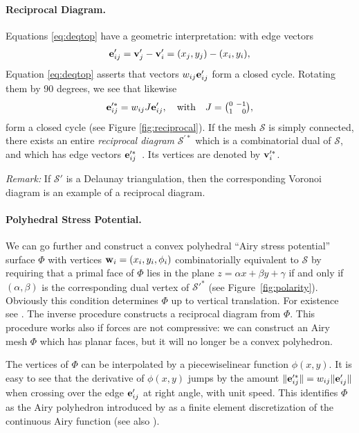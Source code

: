 \documentclass[annual]{acmsiggraph}
\def\SS{{\mathcal S}}
\begin{document}
\paragraph{Reciprocal Diagram.}

Equations \eqref{eq:deqtop} have a geometric interpretation: with edge
vectors
	\begin{align*}
	{\mathbf e}'_{ij} = {\mathbf v}_j'-{\mathbf v}_i'=(x_j, y_j) - (x_i, y_i),
	\end{align*}
 Equation \eqref{eq:deqtop} asserts that vectors $w_{ij} {\mathbf e}_{ij}'$ form a
closed cycle. Rotating them by 90 degrees, we see that likewise
	\begin{align*}
	{\mathbf e}_{ij}^{\prime *} = w_{ij} J {\mathbf e}_{ij}', \quad \text{with}\quad
	J={\textstyle{0 \ -1 \choose 1 \ \hphantom{-}0}},
	\end{align*}
 form a closed cycle (see Figure \ref{fig:reciprocal}). If the mesh $\SS$
is simply connected, there exists an entire {\em reciprocal diagram}
$\SS^{\prime *}$ which is a combinatorial dual of $\SS$, and which has
edge vectors ${\mathbf e}_{ij}'^*$~\cite{Block07}. Its vertices are denoted by ${\mathbf v}_i^{\prime
*}$.

{\it Remark:} If $\SS'$ is a Delaunay triangulation, then the
corresponding Voronoi diagram is an example of a reciprocal diagram.

\paragraph{Polyhedral Stress Potential.}

We can go further and construct a convex polyhedral ``Airy stress
potential'' surface $\Phi$ with vertices ${\mathbf w}_i=(x_i,y_i,\phi_i)$
combinatorially equivalent to $\SS$ by requiring that a primal face of
$\Phi$ lies in the plane $z=\alpha x + \beta y + \gamma$ if and only if
$(\alpha,\beta)$ is the corresponding dual vertex of $\SS'^*$ (see
Figure~\ref{fig:polarity}). Obviously this condition determines $\Phi$ up
to vertical translation. For existence see \cite{Ash1988}. The inverse
procedure constructs a reciprocal diagram from $\Phi$. This procedure
works also if forces are not compressive: we can construct an Airy mesh
$\Phi$ which has planar faces, but it will no longer be a convex
polyhedron.

The vertices of $\Phi$ can be interpolated by a piecewise\dash linear
function $\phi(x,y)$. It is easy to see that the derivative of $\phi(x,y)$
jumps by the amount $\|{\mathbf e}_{ij}'^*\| = w_{ij}\|{\mathbf e}_{ij}'\|$ when crossing
over the edge ${\mathbf e}'_{ij}$ at right angle, with unit speed. This identifies
$\Phi$ as the Airy polyhedron introduced by \cite{Fraternali2002a} as a
finite element discretization of the continuous Airy function (see also
\cite{Fraternali2010}).
\end{document}
